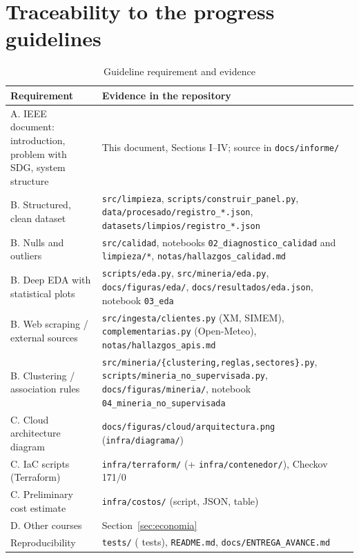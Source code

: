 \documentclass[conference,10pt]{IEEEtran}
\begin{document}
\appendices
\section{Traceability to the progress guidelines}\label{sec:trazabilidad}
\begin{table}[!h]
\caption{Guideline requirement and evidence}
\centering\scriptsize\setlength{\tabcolsep}{3pt}
\begin{tabularx}{\columnwidth}{@{}>{\raggedright\arraybackslash}p{2.2cm}>{\raggedright\arraybackslash}X@{}}
\toprule
Requirement & Evidence in the repository \\
\midrule
A. IEEE document: introduction, problem with SDG, system structure & This document, Sections I--IV; source in \texttt{docs/informe/} \\
B. Structured, clean dataset & \texttt{src/limpieza}, \texttt{scripts/construir\_panel.py}, \texttt{data/procesado/registro\_*.json}, \texttt{datasets/limpios/registro\_*.json} \\
B. Nulls and outliers & \texttt{src/calidad}, notebooks \texttt{02\_diagnostico\_calidad} and \texttt{limpieza/*}, \texttt{notas/hallazgos\_calidad.md} \\
B. Deep EDA with statistical plots & \texttt{scripts/eda.py}, \texttt{src/mineria/eda.py}, \texttt{docs/figuras/eda/}, \texttt{docs/resultados/eda.json}, notebook \texttt{03\_eda} \\
B. Web scraping / external sources & \texttt{src/ingesta/clientes.py} (XM, SIMEM), \texttt{complementarias.py} (Open-Meteo), \texttt{notas/hallazgos\_apis.md} \\
B. Clustering / association rules & \texttt{src/mineria/\{clustering,reglas,sectores\}.py}, \texttt{scripts/mineria\_no\_supervisada.py}, \texttt{docs/figuras/mineria/}, notebook \texttt{04\_mineria\_no\_supervisada} \\
C. Cloud architecture diagram & \texttt{docs/figuras/cloud/arquitectura.png} (\texttt{infra/diagrama/}) \\
C. IaC scripts (Terraform) & \texttt{infra/terraform/} (+ \texttt{infra/contenedor/}), Checkov 171/0 \\
C. Preliminary cost estimate & \texttt{infra/costos/} (script, JSON, table) \\
D. Other courses & Section~\ref{sec:economia} \\
Reproducibility & \texttt{tests/} (\nPruebas{} tests), \texttt{README.md}, \texttt{docs/ENTREGA\_AVANCE.md} \\
\bottomrule
\end{tabularx}
\end{table}
\end{document}
